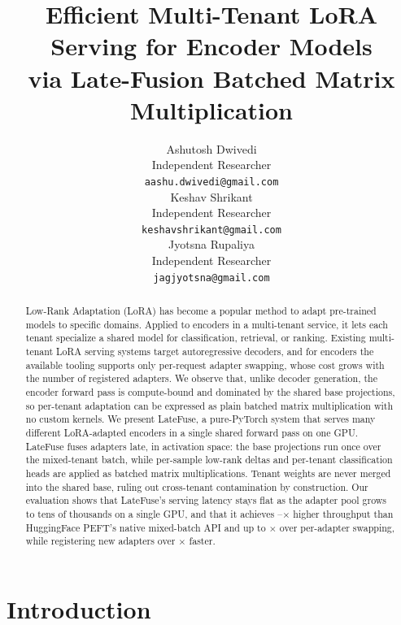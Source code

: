 \documentclass[11pt]{article}
\title{Efficient Multi-Tenant LoRA Serving for Encoder Models\\
via Late-Fusion Batched Matrix Multiplication}
\author{
  Ashutosh Dwivedi \\
  Independent Researcher \\
  \texttt{aashu.dwivedi@gmail.com} \\\And
  Keshav Shrikant \\
  Independent Researcher \\
  \texttt{keshavshrikant@gmail.com} \\\AND
  Jyotsna Rupaliya \\
  Independent Researcher \\
  \texttt{jagjyotsna@gmail.com} \\
}
\newcommand{\sysname}{LateFuse}
\begin{document}
\maketitle

\begin{abstract}
  Low-Rank Adaptation (LoRA) has become a popular method to adapt
  pre-trained models to specific domains. Applied to encoders in a
  multi-tenant service, it lets each tenant specialize a shared model
  for classification, retrieval, or ranking. Existing
  multi-tenant LoRA serving systems target autoregressive decoders,
  and for encoders the available tooling supports only per-request
  adapter swapping, whose cost grows with the number of registered
  adapters. We observe that, unlike decoder generation, the encoder
  forward pass is compute-bound and dominated by the shared base
  projections, so per-tenant adaptation can be expressed as plain
  batched matrix multiplication with no custom kernels. We present
  \sysname, a pure-PyTorch system that serves many different
  LoRA-adapted encoders in a single shared forward pass on one GPU.
  \sysname{} fuses adapters late, in activation space: the base
  projections run once over the mixed-tenant batch, while per-sample
  low-rank deltas and per-tenant classification heads are applied as
  batched matrix multiplications.
  Tenant weights are never merged into the shared base, ruling out
  cross-tenant contamination by construction. Our evaluation shows
  that \sysname's serving latency stays flat as the adapter pool
  grows to tens of thousands on a single GPU, and that it achieves
  \SpeedupMixedMin--\SpeedupMixedMax$\times$ higher throughput than
  HuggingFace PEFT's native mixed-batch API and up to
  \HeadlineSpeedupHigh$\times$ over per-adapter swapping, while
  registering new adapters over \ColdStartSpeedupMin{}$\times$ faster.
\end{abstract}

\section{Introduction}
\label{sec:intro}
\end{document}
